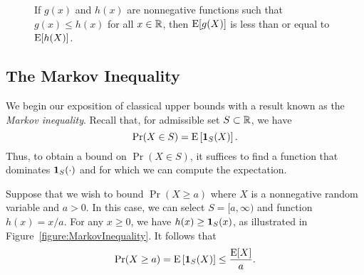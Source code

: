 \begin{figure}[thb]
\begin{center}
\end{center}
\caption{If $g(x)$ and $h(x)$ are nonnegative functions such that $g(x) \leq h(x)$ for all $x \in \mathbb{R}$, then $\mathrm{E} [g (X)]$ is less than or equal to $\mathrm{E} [h(X)]$.}
\label{figure:DominatingFcn}
\end{figure}


\subsection{The Markov Inequality}

We begin our exposition of classical upper bounds with a result known as the \emph{Markov inequality}. 
Recall that, for admissible set $S \subset \mathbb{R}$, we have
\begin{equation*}
\Pr (X \in S) = \mathrm{E} \left[ \mathbf{1}_S (X) \right] .
\end{equation*}
Thus, to obtain a bound on $\Pr (X \in S)$, it suffices to find a function that dominates $\mathbf{1}_S (\cdot)$ and for which we can compute the expectation.

Suppose that we wish to bound $\Pr (X \geq a)$ where $X$ is a nonnegative random variable and $a > 0$.
In this case, we can select $S = [a, \infty)$ and function $h(x) = x/a$.
For any $x \geq 0$, we have $h(x) \geq \mathbf{1}_S(x)$, as illustrated in Figure~\ref{figure:MarkovInequality}.
It follows that
\begin{equation*}
\Pr (X \geq a) = \mathrm{E} \left[ \mathbf{1}_S(X) \right] \leq \frac{\mathrm{E} [X]}{a} .
\end{equation*}


